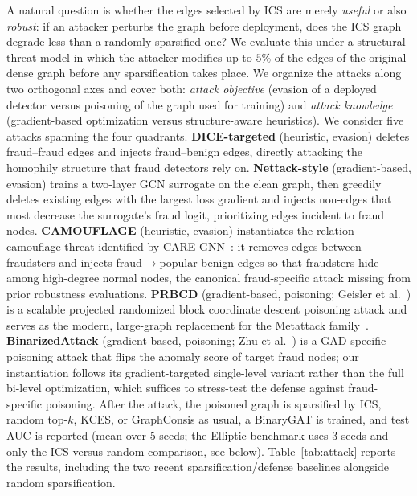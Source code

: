 \documentclass[11pt]{article}
\begin{document}
A natural question is whether the edges selected by ICS are merely \emph{useful} or also \emph{robust}: if an attacker perturbs the graph before deployment, does the ICS graph degrade less than a randomly sparsified one? We evaluate this under a structural threat model in which the attacker modifies up to $5\%$ of the edges of the original dense graph before any sparsification takes place. We organize the attacks along two orthogonal axes and cover both: \emph{attack objective} (evasion of a deployed detector versus poisoning of the graph used for training) and \emph{attack knowledge} (gradient-based optimization versus structure-aware heuristics). We consider five attacks spanning the four quadrants. \textbf{DICE-targeted} (heuristic, evasion) deletes fraud--fraud edges and injects fraud--benign edges, directly attacking the homophily structure that fraud detectors rely on. \textbf{Nettack-style} (gradient-based, evasion) trains a two-layer GCN surrogate on the clean graph, then greedily deletes existing edges with the largest loss gradient and injects non-edges that most decrease the surrogate's fraud logit, prioritizing edges incident to fraud nodes. \textbf{CAMOUFLAGE} (heuristic, evasion) instantiates the relation-camouflage threat identified by CARE-GNN~\cite{dou2020caregnn}: it removes edges between fraudsters and injects fraud$\to$popular-benign edges so that fraudsters hide among high-degree normal nodes, the canonical fraud-specific attack missing from prior robustness evaluations. \textbf{PRBCD} (gradient-based, poisoning; Geisler et al.~\cite{geisler2021prbcd}) is a scalable projected randomized block coordinate descent poisoning attack and serves as the modern, large-graph replacement for the Metattack family~\cite{zugner2019metattack}. \textbf{BinarizedAttack} (gradient-based, poisoning; Zhu et al.~\cite{zhu2022binarized}) is a GAD-specific poisoning attack that flips the anomaly score of target fraud nodes; our instantiation follows its gradient-targeted single-level variant rather than the full bi-level optimization, which suffices to stress-test the defense against fraud-specific poisoning. After the attack, the poisoned graph is sparsified by ICS, random top-$k$, KCES, or GraphConsis as usual, a BinaryGAT is trained, and test AUC is reported (mean over 5 seeds; the Elliptic benchmark uses 3 seeds and only the ICS versus random comparison, see below). Table~\ref{tab:attack} reports the results, including the two recent sparsification/defense baselines alongside random sparsification.
\end{document}
